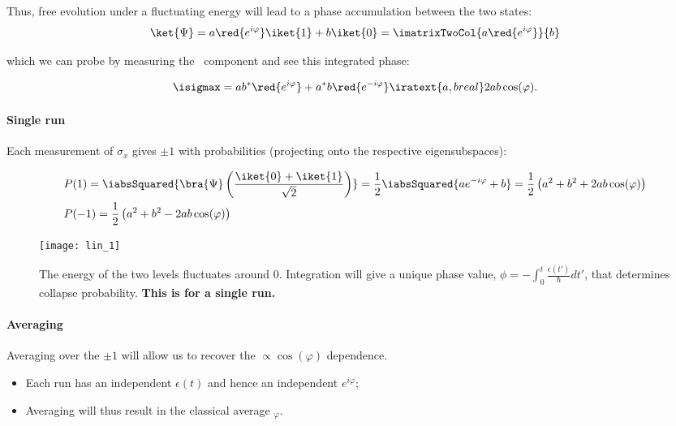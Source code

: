 \begin{framed}\noindent
  \noindent Thus, free  evolution under a fluctuating  energy will lead
  to a phase accumulation between the two states:
  \begin{equation}\label{eq:lin_4}
    \ket{\Psi} = a\red{e^{i\varphi}}\iket{1} + b\iket{0} =  \imatrixTwoCol{a\red{e^{i\varphi}}}{b}
  \end{equation}

  \noindent which we can probe by measuring the \isigmax\ component and
  see this integrated phase:

    \begin{equation}\label{eqn:lin_1}
      \isigmax = ab^{*}\red{e^{i\varphi}} + a^{*}b\red{e^{-i\varphi}} \iratext{a,b real} 2ab\cos(\varphi).
    \end{equation}

  \end{framed}

  \newpage
  \paragraph{Single  run}  Each  measurement  of  $  \sigma_x  $  gives
  $  \pm1   $  with  probabilities  (projecting   onto  the  respective
  eigensubspaces):

  \begin{equation}
    \begin{aligned}
      &P(1) = \iabsSquared{\bra{\Psi}\left(\frac{\iket{0} + \iket{1}}{\sqrt{2}}\right)} = \frac{1}{{2}}\iabsSquared{ae^{-i\varphi} + b} = \frac{1}{2}\left({a}^2 + {b}^2 + 2ab\cos(\varphi) \right)\\
      & P(-1) = \frac{1}{2}\left(a^2 + b^2 - 2ab\cos(\varphi)\right)
    \end{aligned}
  \end{equation}

              \begin{figure}[ht]
                \centering \texttt{[image: lin\_1]}
                \caption{The energy of the two levels fluctuates around
                  0.   Integration  will  give a  unique  phase  value,
                  $ \phi =  -\int_0^t\frac{\epsilon(t')}{\hbar}dt' $, that determines
                  collapse  probability. \textbf{This  is for  a single
                    run.}}
              \end{figure}

              \paragraph{Averaging} Averaging  over the $ \pm  1 $ will
              allow      us      to      recover      the      \isigmax
              $ \propto \cos(\varphi) $ dependence.
              \begin{itemize}
              \item Each run  has an independent $ \epsilon(t) $  and hence an
                independent $ e^{i\varphi} $;
              \item Averaging will thus result in the classical average
                $ _\varphi $.
              \end{itemize}

